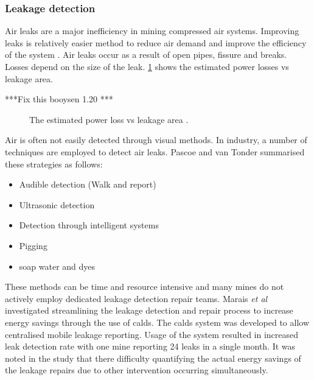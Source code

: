 		 \subsubsection{Leakage detection}
		 Air leaks are a major inefficiency in mining compressed air systems. Improving leaks is relatively easier method to  reduce air demand and improve the efficiency of the system  \cite{van2011sustaining}. Air leaks occur as a result of open pipes, fissure and breaks. Losses depend on the size of the leak. \cref{fig: Leak losses} shows the estimated power losses vs leakage area.
		 \par
		 ***Fix this  booysen 1.20 ***
		 \begin{figure}[h]
		 	\centering
		 	
		 	\caption[The estimated power loss vs leakage area.]{ The estimated power loss vs leakage area \cite{van2011sustaining}.}
		 	\label{fig: Leak losses}
		 \end{figure}
		 Air is often not easily detected through visual methods. In industry, a number of techniques are employed to detect air leaks. Pascoe \cite{Pascoe2016Masters} and van Tonder \cite{vanTonder2010Masters} summarised these strategies as follows:
		 \begin{itemize}
		 	\item Audible detection (Walk and report)
		 	\item Ultrasonic detection
		 	\item Detection through intelligent systems
		 	\item Pigging
		 	\item soap water and dyes
		 \end{itemize}
	 	 These methods can be time and resource intensive and many mines do not actively employ dedicated leakage detection repair teams. Marais \textit{et al} \cite{marais2009increased} investigated streamlining the leakage detection and repair process to increase energy savings through the use of \gls{calds}. The \gls{calds} system was developed to allow centralised mobile leakage reporting. Usage of the system resulted in increased leak detection rate with one mine reporting 24 leaks in a single month. It was noted in the study that there difficulty quantifying the actual energy savings of the leakage repairs due to other intervention occurring simultaneously.	
		 
